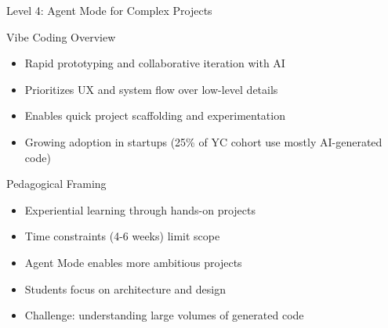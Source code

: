 \documentclass{beamer}
\begin{document}
\begin{frame}{Level 4: Agent Mode for Complex Projects}
    \begin{block}{Vibe Coding Overview}
        \begin{itemize}
            \item Rapid prototyping and collaborative iteration with AI
            \item Prioritizes UX and system flow over low-level details
            \item Enables quick project scaffolding and experimentation
            \item Growing adoption in startups (25\% of YC cohort use mostly AI-generated code)
        \end{itemize}
    \end{block}
    
    \begin{alertblock}{Pedagogical Framing}
        \begin{itemize}
            \item Experiential learning through hands-on projects
            \item Time constraints (4-6 weeks) limit scope
            \item Agent Mode enables more ambitious projects
            \item Students focus on architecture and design
            \item Challenge: understanding large volumes of generated code
        \end{itemize}
    \end{alertblock}
\end{frame}
\end{document}
